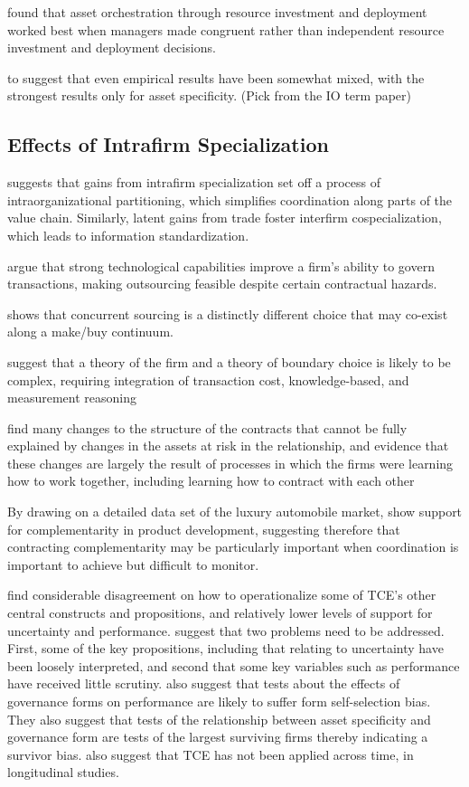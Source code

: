 \documentclass[12pt,letterpaper]{article}
\begin{document}
\cite{Sirmon2009} found that asset orchestration through resource investment and deployment worked best when managers made congruent rather than independent resource investment and deployment decisions.

\cite{David2004} to suggest that even empirical results have been somewhat mixed, with the strongest results only for asset specificity. (Pick from the IO term paper)

\subsection{Effects of Intrafirm Specialization}
\cite{Jacobides2005b} suggests that gains from intrafirm specialization set off a process of intraorganizational partitioning, which simplifies coordination along parts of the value chain. Similarly, latent gains from trade foster interfirm cospecialization, which leads to information standardization.

\cite{Mayer2006} argue that strong technological capabilities improve a firm's ability to govern transactions, making outsourcing feasible despite certain contractual hazards.

\cite{Parmigiani2007} shows that concurrent sourcing is a distinctly different choice that may co-exist along a make/buy continuum.

\cite{Poppo1998}  suggest that a theory of the firm and a theory of boundary choice is likely to be complex, requiring integration of transaction cost, knowledge-based, and measurement reasoning

\cite{Mayer2004} find many changes to the structure of the contracts that cannot be fully explained by changes in the assets at risk in the relationship, and evidence that these changes are largely the result of processes in which the firms were learning how to work together, including learning how to contract with each other
 
By drawing on a detailed data set of the luxury automobile market, \cite{Novak2009} show support for complementarity in product development, suggesting therefore that contracting complementarity may be particularly important when coordination is important to achieve but difficult to monitor.
 
\cite{David2004} find considerable disagreement on how to operationalize some of TCE's other central constructs and propositions, and relatively lower levels of support for uncertainty and performance. \cite{David2004} suggest that two problems need to be addressed. First, some of the key propositions, including that relating to uncertainty have been loosely interpreted, and second that some key variables such as performance have received little scrutiny. \cite{David2004} also suggest that tests about the effects of governance forms on performance are likely to suffer form self-selection bias. They also suggest that tests of the relationship between asset specificity and governance form are tests of the largest surviving firms thereby indicating a survivor bias. \cite{David2004} also suggest that TCE has not been applied across time, in longitudinal studies. 
\end{document}
